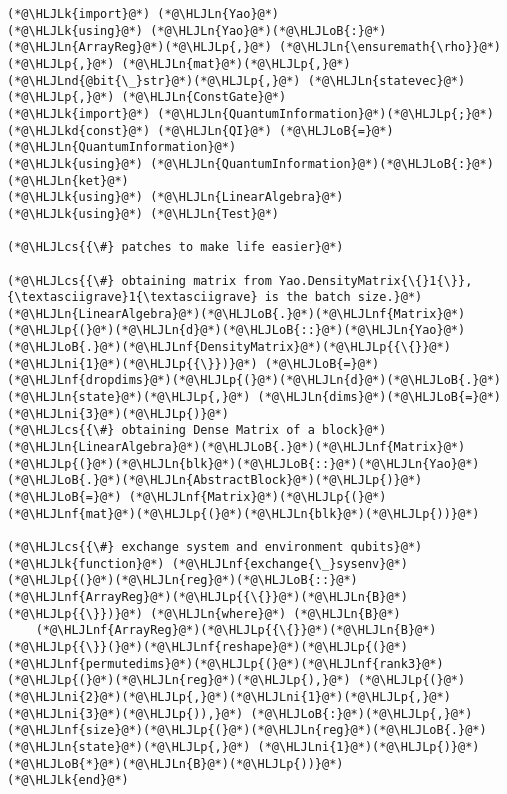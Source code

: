 \documentclass[11pt,a4paper]{article}
\newcommand{\HLJLk}[1]{\textcolor[RGB]{148,91,176}{\textbf{#1}}}
\newcommand{\HLJLkd}[1]{\textcolor[RGB]{214,102,97}{\textit{#1}}}
\newcommand{\HLJLn}[1]{#1}
\newcommand{\HLJLnd}[1]{\textcolor[RGB]{214,102,97}{#1}}
\newcommand{\HLJLnf}[1]{\textcolor[RGB]{66,102,213}{#1}}
\newcommand{\HLJLni}[1]{\textcolor[RGB]{59,151,46}{#1}}
\newcommand{\HLJLoB}[1]{\textcolor[RGB]{102,102,102}{\textbf{#1}}}
\newcommand{\HLJLp}[1]{#1}
\newcommand{\HLJLcs}[1]{\textcolor[RGB]{153,153,119}{\textit{#1}}}
\begin{document}
\begin{lstlisting}
(*@\HLJLk{import}@*) (*@\HLJLn{Yao}@*)
(*@\HLJLk{using}@*) (*@\HLJLn{Yao}@*)(*@\HLJLoB{:}@*) (*@\HLJLn{ArrayReg}@*)(*@\HLJLp{,}@*) (*@\HLJLn{\ensuremath{\rho}}@*)(*@\HLJLp{,}@*) (*@\HLJLn{mat}@*)(*@\HLJLp{,}@*) (*@\HLJLnd{@bit{\_}str}@*)(*@\HLJLp{,}@*) (*@\HLJLn{statevec}@*)(*@\HLJLp{,}@*) (*@\HLJLn{ConstGate}@*)
(*@\HLJLk{import}@*) (*@\HLJLn{QuantumInformation}@*)(*@\HLJLp{;}@*) (*@\HLJLkd{const}@*) (*@\HLJLn{QI}@*) (*@\HLJLoB{=}@*) (*@\HLJLn{QuantumInformation}@*)
(*@\HLJLk{using}@*) (*@\HLJLn{QuantumInformation}@*)(*@\HLJLoB{:}@*) (*@\HLJLn{ket}@*)
(*@\HLJLk{using}@*) (*@\HLJLn{LinearAlgebra}@*)
(*@\HLJLk{using}@*) (*@\HLJLn{Test}@*)

(*@\HLJLcs{{\#} patches to make life easier}@*)

(*@\HLJLcs{{\#} obtaining matrix from Yao.DensityMatrix{\{}1{\}}, {\textasciigrave}1{\textasciigrave} is the batch size.}@*)
(*@\HLJLn{LinearAlgebra}@*)(*@\HLJLoB{.}@*)(*@\HLJLnf{Matrix}@*)(*@\HLJLp{(}@*)(*@\HLJLn{d}@*)(*@\HLJLoB{::}@*)(*@\HLJLn{Yao}@*)(*@\HLJLoB{.}@*)(*@\HLJLnf{DensityMatrix}@*)(*@\HLJLp{{\{}}@*)(*@\HLJLni{1}@*)(*@\HLJLp{{\}})}@*) (*@\HLJLoB{=}@*) (*@\HLJLnf{dropdims}@*)(*@\HLJLp{(}@*)(*@\HLJLn{d}@*)(*@\HLJLoB{.}@*)(*@\HLJLn{state}@*)(*@\HLJLp{,}@*) (*@\HLJLn{dims}@*)(*@\HLJLoB{=}@*)(*@\HLJLni{3}@*)(*@\HLJLp{)}@*)
(*@\HLJLcs{{\#} obtaining Dense Matrix of a block}@*)
(*@\HLJLn{LinearAlgebra}@*)(*@\HLJLoB{.}@*)(*@\HLJLnf{Matrix}@*)(*@\HLJLp{(}@*)(*@\HLJLn{blk}@*)(*@\HLJLoB{::}@*)(*@\HLJLn{Yao}@*)(*@\HLJLoB{.}@*)(*@\HLJLn{AbstractBlock}@*)(*@\HLJLp{)}@*) (*@\HLJLoB{=}@*) (*@\HLJLnf{Matrix}@*)(*@\HLJLp{(}@*)(*@\HLJLnf{mat}@*)(*@\HLJLp{(}@*)(*@\HLJLn{blk}@*)(*@\HLJLp{))}@*)

(*@\HLJLcs{{\#} exchange system and environment qubits}@*)
(*@\HLJLk{function}@*) (*@\HLJLnf{exchange{\_}sysenv}@*)(*@\HLJLp{(}@*)(*@\HLJLn{reg}@*)(*@\HLJLoB{::}@*)(*@\HLJLnf{ArrayReg}@*)(*@\HLJLp{{\{}}@*)(*@\HLJLn{B}@*)(*@\HLJLp{{\}})}@*) (*@\HLJLn{where}@*) (*@\HLJLn{B}@*)
    (*@\HLJLnf{ArrayReg}@*)(*@\HLJLp{{\{}}@*)(*@\HLJLn{B}@*)(*@\HLJLp{{\}}(}@*)(*@\HLJLnf{reshape}@*)(*@\HLJLp{(}@*)(*@\HLJLnf{permutedims}@*)(*@\HLJLp{(}@*)(*@\HLJLnf{rank3}@*)(*@\HLJLp{(}@*)(*@\HLJLn{reg}@*)(*@\HLJLp{),}@*) (*@\HLJLp{(}@*)(*@\HLJLni{2}@*)(*@\HLJLp{,}@*)(*@\HLJLni{1}@*)(*@\HLJLp{,}@*)(*@\HLJLni{3}@*)(*@\HLJLp{)),}@*) (*@\HLJLoB{:}@*)(*@\HLJLp{,}@*)(*@\HLJLnf{size}@*)(*@\HLJLp{(}@*)(*@\HLJLn{reg}@*)(*@\HLJLoB{.}@*)(*@\HLJLn{state}@*)(*@\HLJLp{,}@*) (*@\HLJLni{1}@*)(*@\HLJLp{)}@*)(*@\HLJLoB{*}@*)(*@\HLJLn{B}@*)(*@\HLJLp{))}@*)
(*@\HLJLk{end}@*)
\end{lstlisting}
\end{document}

